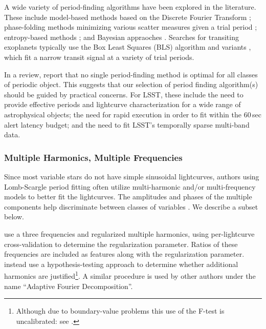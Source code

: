 \documentclass[DM,authoryear,toc]{lsstdoc}
\begin{document}
A wide variety of period-finding algorithms have been explored in the literature.
These include model-based methods based on the Discrete Fourier Transform \citep[especially the Lomb-Scargle Periodogram and variants;][]{Lomb:76:Least-Squares-F, Scargle:82:Studies-in-astr,Zechmeister:09:GeneralisedLS,VanderPlas:18:UnderstandingLS};
phase-folding methods minimizing various scatter measures given a trial period \citep[e.g.,][]{Stellingwerf:78:PDM,Dworetsky:83:StringLength,Schwarzenberg-Czerny:89:AOV,Clarke:02:StringLength,Zucker:16:SerialIndependence};
entropy-based methods \citep[e.g.,]{Cincotta:95:Astronomical-Ti,Cincotta:99:Astronomical-ti,Huijse:12:CorrentropyPeriodogram, Graham:13:ConditionalEntropy};
and Bayesian appraoches \citep[e.g.,][]{Gregory:92:A-New-Method-fo,Wang:12:NonpBayesPeriods}.
Searches for transiting exoplanets typically use the Box Least Squares (BLS) algorithm \citep{Kovacs:02:BoxLS} and variants \citep[e.g.,][]{Heller:19:TransitLS}, which fit a narrow transit signal at a variety of trial periods.

In a review, \citet{Graham:13:PeriodFindingComparison} report that no single period-finding method is optimal for all classes of periodic object.
This suggests that our selection of period finding algorithm(s) should be guided by practical concerns.
For LSST, these include the need to provide effective periods and lightcurve characterization for a wide range of astrophysical objects; the need for rapid execution in order to fit within the 60\,sec alert latency budget; and the need to fit LSST's temporally sparse multi-band data.

\subsubsection{Multiple Harmonics, Multiple Frequencies}

Since most variable stars do not have simple sinusoidal lightcurves, authors using Lomb-Scargle period fitting often utilize multi-harmonic and/or multi-frequency models to better fit the lightcurves.
The amplitudes and phases of the multiple components help discriminate between classes of variables \citep[e.g.,][]{Selam:04:WUMa}.
We describe a subset below.

\citet{Richards:12:ASASCatalog} use a three frequencies and regularized multiple harmonics, using per-lightcurve cross-validation to determine the regularization parameter.
Ratios of these frequencies are included as features along with the regularization parameter.
\citet{Dubath:11:VariableClassification} instead use a hypothesis-testing approach to determine whether additional harmonics are justified\footnote{Although due to boundary-value problems this use of the F-test is uncalibrated: see \citet{Protassov:02:LRTest}.}.
A similar procedure is used by other authors \citep[e.g.,][]{Drake:13:CSSRRLyr,Torrealba:15:SouthCSSRRLyr} under the name ``Adaptive Fourier Decomposition''.
\end{document}

